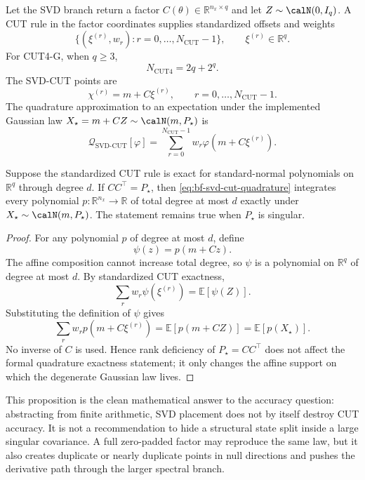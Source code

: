 Let the SVD branch return a factor $C(\theta)\in\mathbb R^{n_x\times q}$ and
let $Z\sim\calN(0,I_q)$.  A CUT rule in the factor coordinates supplies
standardized offsets and weights
\[
  \{(\xi^{(r)},w_r): r=0,\ldots,N_{\mathrm{CUT}}-1\},
  \qquad
  \xi^{(r)}\in\mathbb R^q.
\]
For CUT4-G, when $q\ge3$,
\[
  N_{\mathrm{CUT4}}=2q+2^q .
\]
The SVD-CUT points are
\begin{equation}
\label{eq:bf-svd-cut-cloud}
  \chi^{(r)}=m+C\xi^{(r)},\qquad
  r=0,\ldots,N_{\mathrm{CUT}}-1.
\end{equation}
The quadrature approximation to an expectation under the implemented Gaussian
law $X_\star=m+CZ\sim\calN(m,P_\star)$ is
\begin{equation}
\label{eq:bf-svd-cut-quadrature}
  \mathcal Q_{\mathrm{SVD}\text{-}\mathrm{CUT}}[\varphi]
  =
  \sum_{r=0}^{N_{\mathrm{CUT}}-1} w_r
  \varphi(m+C\xi^{(r)}).
\end{equation}

\begin{proposition}
\label{prop:bf-svd-cut-affine-exactness}
Suppose the standardized CUT rule is exact for standard-normal polynomials on
$\mathbb R^q$ through degree $d$.  If $C C^\top=P_\star$, then
\eqref{eq:bf-svd-cut-quadrature} integrates every polynomial
$p:\mathbb R^{n_x}\to\mathbb R$ of total degree at most $d$ exactly under
$X_\star\sim\calN(m,P_\star)$.  The statement remains true when
$P_\star$ is singular.
\end{proposition}

\begin{proof}
For any polynomial $p$ of degree at most $d$, define
\[
  \psi(z)=p(m+Cz).
\]
The affine composition cannot increase total degree, so $\psi$ is a polynomial
on $\mathbb R^q$ of degree at most $d$.  By standardized CUT exactness,
\[
  \sum_r w_r \psi(\xi^{(r)})
  =
  \mathbb E[\psi(Z)].
\]
Substituting the definition of $\psi$ gives
\[
  \sum_r w_r p(m+C\xi^{(r)})
  =
  \mathbb E[p(m+CZ)]
  =
  \mathbb E[p(X_\star)].
\]
No inverse of $C$ is used.  Hence rank deficiency of $P_\star=C C^\top$ does
not affect the formal quadrature exactness statement; it only changes the
affine support on which the degenerate Gaussian law lives.
\end{proof}

This proposition is the clean mathematical answer to the accuracy question:
abstracting from finite arithmetic, SVD placement does not by itself destroy
CUT accuracy.  It is not a recommendation to hide a structural state split
inside a large singular covariance.  A full zero-padded factor may reproduce
the same law, but it also creates duplicate or nearly duplicate points in null
directions and pushes the derivative path through the larger spectral branch.

